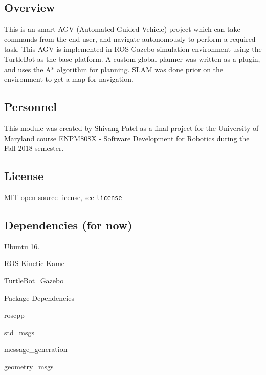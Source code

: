 \href{https://travis-ci.org/shivaang12/smart_agv}{\tt } \href{https://coveralls.io/github/shivaang12/smart_agv?branch=master}{\tt }

\subsection*{Overview}

This is an smart A\+GV (Automated Guided Vehicle) project which can take commands from the end user, and navigate autonomously to perform a required task. This A\+GV is implemented in R\+OS Gazebo simulation environment using the Turtle\+Bot as the base platform. A custom global planner was written as a plugin, and uses the A$\ast$ algorithm for planning. S\+L\+AM was done prior on the environment to get a map for navigation.

\subsection*{Personnel}

This module was created by Shivang Patel as a final project for the University of Maryland course E\+N\+P\+M808X -\/ Software Development for Robotics during the Fall 2018 semester.

\subsection*{License}

M\+IT open-\/source license, see \href{https://opensource.org/licenses/MIT}{\tt license}

\subsection*{Dependencies (for now)}


\begin{DoxyItemize}
\item Ubuntu 16.
\item R\+OS Kinetic Kame
\item Turtle\+Bot\+\_\+\+Gazebo
\item Package Dependencies
\begin{DoxyItemize}
\item roscpp
\item std\+\_\+msgs
\item message\+\_\+generation
\item geometry\+\_\+msgs
\end{DoxyItemize}
\end{DoxyItemize}


